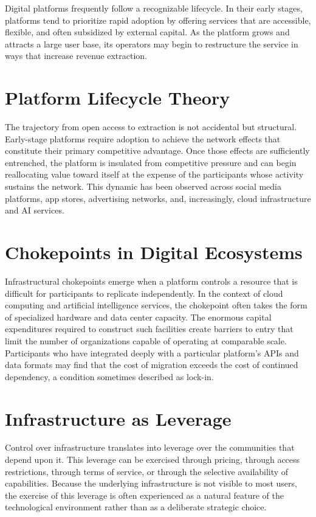 \documentclass[12pt]{book}
\theoremstyle{definition}
\theoremstyle{remark}
\begin{document}
Digital platforms frequently follow a recognizable lifecycle. In
their early stages, platforms tend to prioritize rapid adoption by
offering services that are accessible, flexible, and often subsidized
by external capital. As the platform grows and attracts a large user
base, its operators may begin to restructure the service in ways that
increase revenue extraction.

\section{Platform Lifecycle Theory}

The trajectory from open access to extraction is not accidental but
structural. Early-stage platforms require adoption to achieve the
network effects that constitute their primary competitive advantage.
Once those effects are sufficiently entrenched, the platform is
insulated from competitive pressure and can begin reallocating value
toward itself at the expense of the participants whose activity
sustains the network. This dynamic has been observed across social
media platforms, app stores, advertising networks, and, increasingly,
cloud infrastructure and AI services.

\section{Chokepoints in Digital Ecosystems}

Infrastructural chokepoints emerge when a platform controls a
resource that is difficult for participants to replicate
independently. In the context of cloud computing and artificial
intelligence services, the chokepoint often takes the form of
specialized hardware and data center capacity. The enormous capital
expenditures required to construct such facilities create barriers to
entry that limit the number of organizations capable of operating at
comparable scale. Participants who have integrated deeply with a
particular platform's APIs and data formats may find that the cost of
migration exceeds the cost of continued dependency, a condition
sometimes described as lock-in.

\section{Infrastructure as Leverage}

Control over infrastructure translates into leverage over the
communities that depend upon it. This leverage can be exercised
through pricing, through access restrictions, through terms of
service, or through the selective availability of capabilities.
Because the underlying infrastructure is not visible to most users,
the exercise of this leverage is often experienced as a natural
feature of the technological environment rather than as a deliberate
strategic choice.
\end{document}
